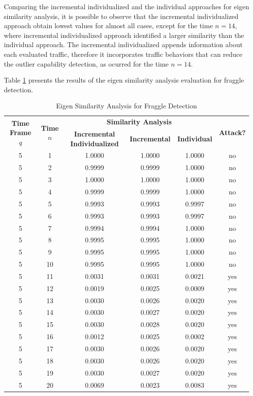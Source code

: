 \documentclass[review]{elsarticle}
\begin{document}
Comparing the incremental individualized and the individual approaches for eigen similarity analysis, it is possible to observe that the incremental individualized approach obtain lowest values for almost all cases, except for the time $n=14$, where incremental individualized approach identified a larger similarity than the individual approach. The incremental individualized appends information about each evaluated traffic, therefore it incorporates traffic behaviors that can reduce the outlier capability detection, as ocurred for the time $n=14$.

Table \ref{tab:tab7} presents the results of the eigen similarity analysis evaluation for fraggle detection.

\begin{table}[h!]
  \centering
  \footnotesize
  \caption{Eigen Similarity Analysis for Fraggle Detection}
  \label{tab:tab7}
  \begin{tabular}{ c c c c c c }
	\toprule
	\multirow{2}{*}{\textbf{Time Frame} $q$} &\multirow{2}{*}{\textbf{Time} $n$}   &\multicolumn{3}{c}{\textbf{Similarity Analysis}} &\multirow{2}{*}{\textbf{Attack?}}\\ 
			\hhline{~~---~}
			& &\textbf{Incremental Individualized} &\textbf{Incremental} &\textbf{Individual}\\
	\midrule
	5 &1 &1.0000 &1.0000 &1.0000 &no \\
	5 &2 &0.9999 &0.9999 &1.0000 &no \\
	5 &3 &1.0000 &1.0000 &1.0000 &no \\
	5 &4 &0.9999 &0.9999 &1.0000 &no \\
	5 &5 &0.9993 &0.9993 &0.9997 &no \\
	5 &6 &0.9993 &0.9993 &0.9997 &no \\
	5 &7 &0.9994 &0.9994 &1.0000 &no \\
	5 &8 &0.9995 &0.9995 &1.0000 &no \\
	5 &9 &0.9995 &0.9995 &1.0000 &no \\
	5 &10 &0.9995 &0.9995 &1.0000 &no \\
	5 &11 &0.0031 &0.0031 &0.0021 &yes \\
	5 &12 &0.0019 &0.0025 &0.0009 &yes \\
	5 &13 &0.0030 &0.0026 &0.0020 &yes \\
	5 &14 &0.0030 &0.0027 &0.0020 &yes \\
	5 &15 &0.0030 &0.0028 &0.0020 &yes \\
	5 &16 &0.0012 &0.0025 &0.0002 &yes \\
	5 &17 &0.0030 &0.0026 &0.0020 &yes \\
	5 &18 &0.0030 &0.0026 &0.0020 &yes \\
	5 &19 &0.0030 &0.0027 &0.0020 &yes \\
	5 &20 &0.0069 &0.0023 &0.0083 &yes \\
    \bottomrule
  \end{tabular}
\end{table}
\end{document}
